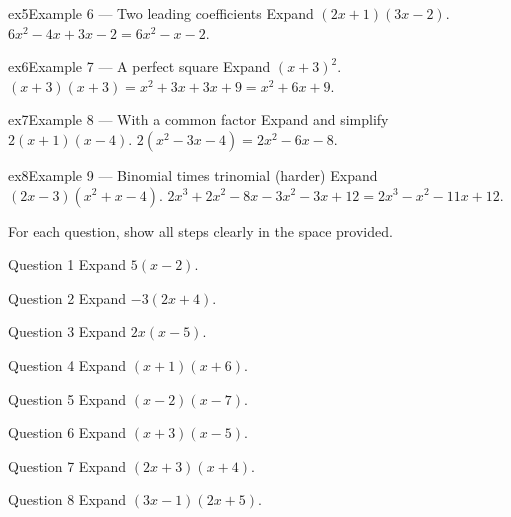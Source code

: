 \documentclass[11pt]{article}
\begin{document}
\begin{example}{ex5}{Example 6 --- Two leading coefficients}
Expand $(2x+1)(3x-2)$.
\soln $6x^2-4x+3x-2=6x^2-x-2.$
\end{example}

\begin{example}{ex6}{Example 7 --- A perfect square}
Expand $(x+3)^2$.
\soln $(x+3)(x+3)=x^2+3x+3x+9=x^2+6x+9.$
\end{example}

\begin{example}{ex7}{Example 8 --- With a common factor}
Expand and simplify $2(x+1)(x-4)$.
\soln $2(x^2-3x-4)=2x^2-6x-8.$
\end{example}

\begin{example}{ex8}{Example 9 --- Binomial times trinomial (harder)}
Expand $(2x-3)(x^2+x-4)$.
\soln $2x^3+2x^2-8x-3x^2-3x+12=2x^3-x^2-11x+12.$
\end{example}

\clearpage
{}
For each question, show all steps clearly in the space provided.

\begin{qbox}{Question 1}
Expand $5(x-2)$.\workspace{1.8cm}
\end{qbox}

\begin{qbox}{Question 2}
Expand $-3(2x+4)$.\workspace{1.8cm}
\end{qbox}

\begin{qbox}{Question 3}
Expand $2x(x-5)$.\workspace{1.8cm}
\end{qbox}

\begin{qbox}{Question 4}
Expand $(x+1)(x+6)$.\workspace{2.0cm}
\end{qbox}

\begin{qbox}{Question 5}
Expand $(x-2)(x-7)$.\workspace{2.0cm}
\end{qbox}

\begin{qbox}{Question 6}
Expand $(x+3)(x-5)$.\workspace{2.0cm}
\end{qbox}

\begin{qbox}{Question 7}
Expand $(2x+3)(x+4)$.\workspace{2.0cm}
\end{qbox}

\begin{qbox}{Question 8}
Expand $(3x-1)(2x+5)$.\workspace{2.0cm}
\end{qbox}
\end{document}
